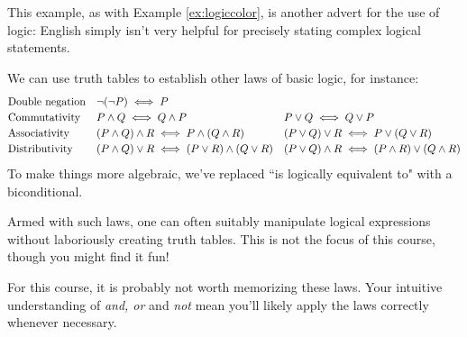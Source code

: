 This example, as with Example \ref{ex:logiccolor}, is another advert for the use of logic: English simply isn't very helpful for precisely stating complex logical statements.


\begin{aside}{}{}
\label{pg:asidelogicalgebra}

We can use truth tables to establish other laws of basic logic, for instance:
\[
	\def\arraystretch{1.2}
	\begin{array}{@{}lll@{}}
	\text{Double negation} & \neg(\neg P)\iff P &\\
	\text{Commutativity} & P\wedge Q\iff Q\wedge P & P\vee Q\iff Q\vee P\\
	\text{Associativity} & (P\wedge Q)\wedge R\iff P\wedge(Q\wedge R) & (P\vee Q)\vee R\iff P\vee(Q\vee R)\\
	\text{Distributivity}&(P\wedge Q)\vee R\iff (P\vee R)\wedge (Q\vee R) & (P\vee Q)\wedge R\iff (P\wedge R)\vee (Q\wedge R)
	\end{array}
\]
To make things more algebraic, we've replaced ``is logically equivalent to" with a biconditional.\footnotemark{}\smallbreak

Armed with such laws, one can often suitably manipulate logical expressions without laboriously creating truth tables. This is not the focus of this course, though you might find it fun!\smallbreak

For this course, it is probably not worth memorizing these laws. Your intuitive understanding of \emph{and, or} and \emph{not} mean you'll likely apply the laws correctly whenever necessary.
\end{aside}


\goodbreak

